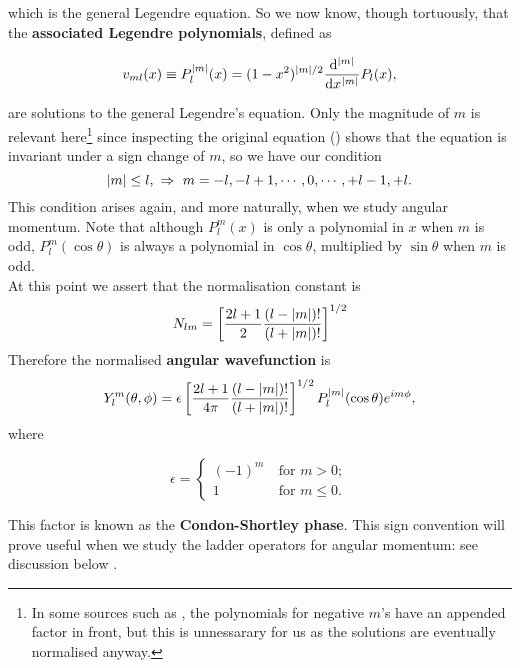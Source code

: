 which is the general Legendre equation. So we now know, though 
tortuously, that the \textbf{associated Legendre polynomials}, defined as 
\begin{defi}
\begin{equation}
\label{ass_lgd_pnm}
v_{ml}(x)\equiv P^{|m|}_l(x)=(1-x^2)^{|m|/2}\diff*[|m|]{P_l(x)}x, 
\end{equation}
\end{defi}
are solutions to the general Legendre's equation. Only the magnitude of $m$ 
is relevant here\footnote{In some sources such as \cite{wiki_ass_lgd}, 
the polynomials for negative $m$'s have an appended factor in front, but this is 
unnessarary for us as the solutions are eventually normalised anyway.}
since inspecting the original equation () 
shows that the equation is invariant under a sign change of $m$, so we have our condition
\begin{equation}
\label{ml_degen}
|m|\leq l,\ \Rightarrow\ m=-l,-l+1,\cdots,0,\cdots,+l-1,+l. 
\end{equation}
This condition arises again, and more naturally, when we study angular momentum. 
Note that although $P^m_l(x)$ is only a polynomial in $x$ when $m$ is odd, 
$P^m_l(\cos\theta)$ is always a polynomial in $\cos\theta$, multiplied by 
$\sin\theta$ when $m$ is odd. \\
At this point we assert that the normalisation constant is 
\begin{equation}
N_{lm}=\left[\frac{2l+1}{2}\frac{(l-|m|)!}{(l+|m|)!} \right]^{1/2}
\end{equation}
Therefore the normalised \textbf{angular wavefunction} is 
\begin{equation}
\label{sphericalharmonics}
Y^m_l(\theta,\phi)=\epsilon\left[\frac{2l+1}{4\pi}\frac{(l-|m|)!}{(l+|m|)!} \right]^{1/2}P^{|m|}_l(\cos\theta)e^{im\phi}, 
\end{equation}
where 
\begin{singlespace}
\begin{equation}
\label{csphase}
\epsilon=
\begin{cases}
(-1)^m\ &\text{for }m>0;\\
1\ &\text{for }m\leq0.
\end{cases}
\end{equation}
\end{singlespace}
This factor is known as the \textbf{Condon-Shortley phase}. 
This sign convention will prove useful when we study the ladder operators for 
angular momentum: see discussion below . 
